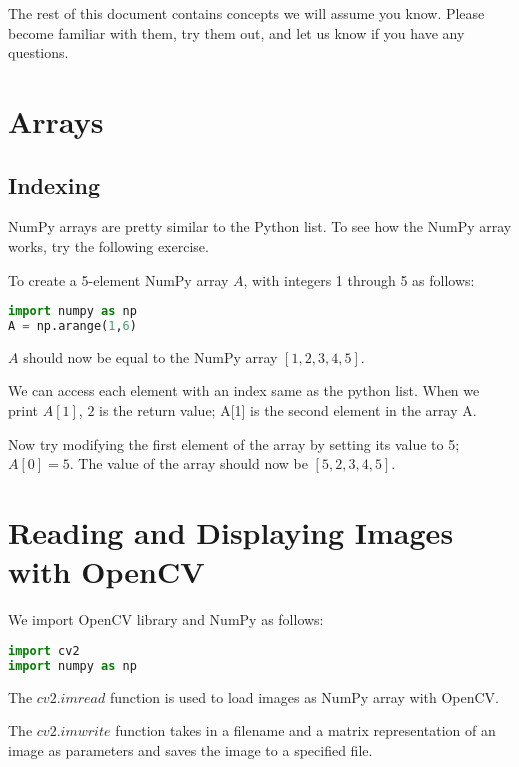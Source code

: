 \documentclass[11pt]{article}
\begin{document}
The rest of this document contains concepts we will assume you know. Please become familiar with them, try them out, and let us know if you have any questions.

\section{Arrays}

\subsection{Indexing}

NumPy arrays are pretty similar to the Python list. To see how the NumPy array works, try the following exercise.

To create a 5-element NumPy array $A$, with integers 1 through 5 as follows:

\begin{lstlisting}[language=python]
import numpy as np
A = np.arange(1,6)
\end{lstlisting}

$A$ should now be equal to the NumPy array $[1,2,3,4,5]$.

We can access each element with an index same as the python list. When we print $A[1]$, $2$ is the return value; A[1] is the second element in the array A.

Now try modifying the first element of the array by setting its value to 5; $A[0]=5$. The value of the array should now be $[5,2,3,4,5]$.


\section{Reading and Displaying Images with OpenCV}

We import OpenCV library and NumPy as follows:\begin{lstlisting}[language=python]
import cv2
import numpy as np
\end{lstlisting}

The \href{https://docs.opencv.org/4.5.2/d4/da8/group__imgcodecs.html#ga288b8b3da0892bd651fce07b3bbd3a56}{$cv2.imread$} function is used to load images as NumPy array with OpenCV.

The \href{https://docs.opencv.org/4.5.2/d4/da8/group__imgcodecs.html#gabbc7ef1aa2edfaa87772f1202d67e0ce}{$cv2.imwrite$} function takes in a filename and a matrix representation of an image as parameters and saves the image to a specified file.
\end{document}
